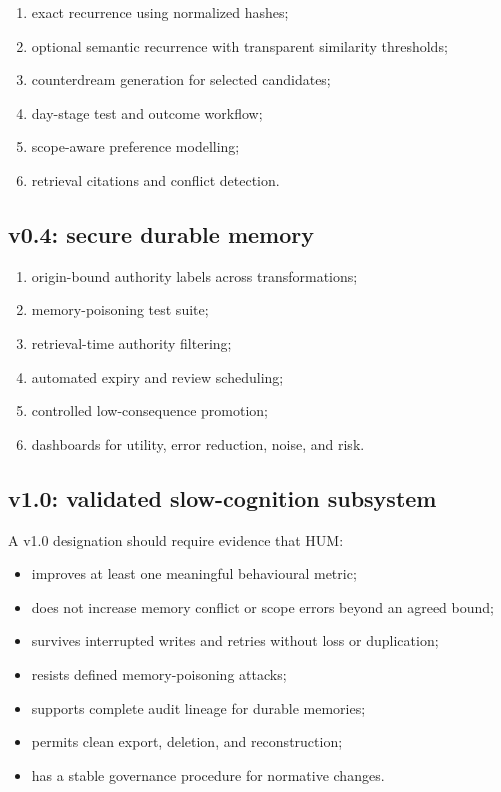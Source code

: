 \documentclass[11pt,a4paper]{article}
\begin{document}
\begin{enumerate}
  \item exact recurrence using normalized hashes;
  \item optional semantic recurrence with transparent similarity thresholds;
  \item counterdream generation for selected candidates;
  \item day-stage test and outcome workflow;
  \item scope-aware preference modelling;
  \item retrieval citations and conflict detection.
\end{enumerate}

\subsection{v0.4: secure durable memory}

\begin{enumerate}
  \item origin-bound authority labels across transformations;
  \item memory-poisoning test suite;
  \item retrieval-time authority filtering;
  \item automated expiry and review scheduling;
  \item controlled low-consequence promotion;
  \item dashboards for utility, error reduction, noise, and risk.
\end{enumerate}

\subsection{v1.0: validated slow-cognition subsystem}

A v1.0 designation should require evidence that HUM:

\begin{itemize}
  \item improves at least one meaningful behavioural metric;
  \item does not increase memory conflict or scope errors beyond an agreed bound;
  \item survives interrupted writes and retries without loss or duplication;
  \item resists defined memory-poisoning attacks;
  \item supports complete audit lineage for durable memories;
  \item permits clean export, deletion, and reconstruction;
  \item has a stable governance procedure for normative changes.
\end{itemize}
\end{document}

